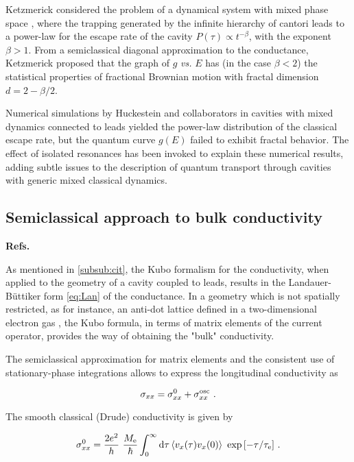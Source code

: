\documentclass[a4paper,10pt]{article}
\newcommand{\dif}{\mathrm{d}}
\newcommand{\nin}{\noindent}
\def\Me{M_{\rm e}}
\newcommand{\be}{\begin{equation}}
\newcommand{\ee}{\end{equation}}
\begin{document}
\nin Ketzmerick considered the problem of a dynamical system with mixed phase space \cite{roland}, where the trapping generated by the infinite hierarchy of cantori leads to a power-law for the escape rate of the cavity $P(\tau) \propto t^{-\beta}$, with the exponent $\beta > 1$. From a semiclassical diagonal approximation to the conductance, Ketzmerick proposed that the graph of $g$ {\em vs.} $E$ has (in the case $\beta < 2$) the statistical properties of fractional Brownian motion with fractal dimension $d=2-\beta/2$.

\nin Numerical simulations by Huckestein and collaborators \cite{bodo}
in cavities with mixed dynamics connected to leads yielded the power-law distribution of the classical escape rate, but the quantum curve $g(E)$ failed to exhibit fractal behavior. The effect of isolated resonances 
\cite{Hufnagel01} has been invoked to explain these numerical results, adding subtle issues to the description of quantum transport through cavities with generic mixed classical dynamics. 

\subsection{Semiclassical approach to bulk conductivity}
\label{subsec:satbc}

{\bf Refs.~\cite{Klaus}}

\nin As mentioned in \ref{subsub:cit}, the Kubo formalism for the conductivity, when applied to the geometry of a cavity coupled to leads, 
results in the Landauer-B\"uttiker form \eqref{eq:Lan} of the conductance. In a geometry which is not spatially restricted, as for instance, an anti-dot lattice defined in a two-dimensional electron gas \cite{Weiss93}, the Kubo formula, in terms of matrix elements of the current operator, provides the way of obtaining the "bulk" conductivity. 

\nin The semiclassical approximation for matrix elements \cite{Wilk} and the consistent use of stationary-phase integrations allows to express the longitudinal conductivity as

\be
\sigma_{xx} = \sigma_{xx}^{0} + \sigma_{xx}^{\rm osc} \ .
\ee

\nin The smooth classical (Drude) conductivity is given by \cite{Fleisch}

\be
\sigma_{xx}^{0} = \frac{2e^2}{h} \ \frac{\Me}{\hbar} \int_{0}^{\infty} 
\dif \tau \left\langle v_{x}(\tau)v_{x}(0) \right\rangle \
\exp{[-\tau/\tau_{\rm e}]} \ .
\ee
\end{document}
